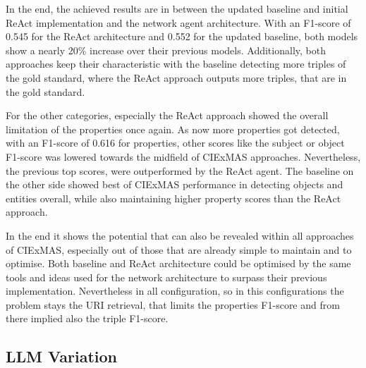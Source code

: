 \documentclass[a4paper,oneside,bibliography=totoc]{scrbook}
\begin{document}
In the end, the achieved results are in between the updated baseline and initial ReAct implementation and the network agent architecture. With an F1-score of 0.545 for the ReAct architecture and 0.552 for the updated baseline, both models show a nearly 20\% increase over their previous models. Additionally, both approaches keep their characteristic with the baseline detecting more triples of the gold standard, where the ReAct approach outputs more triples, that are in the gold standard.

For the other categories, especially the ReAct approach showed the overall limitation of the properties once again. As now more properties got detected, with an F1-score of 0.616 for properties, other scores like the subject or object F1-score was lowered towards the midfield of CIExMAS approaches. Nevertheless, the previous top scores, were outperformed by the ReAct agent. The baseline on the other side showed best of CIExMAS performance in detecting objects and entities overall, while also maintaining higher property scores than the ReAct approach.

In the end it shows the potential that can also be revealed within all approaches of CIExMAS, especially out of those that are already simple to maintain and to optimise. Both baseline and ReAct architecture could be optimised by the same tools and ideas used for the network architecture to surpass their previous implementation. Nevertheless in all configuration, so in this configurations the problem stays the URI retrieval, that limits the properties F1-score and from there implied also the triple F1-score.

\subsection{LLM Variation}
\label{subsec:llm_model_variation}
\end{document}
